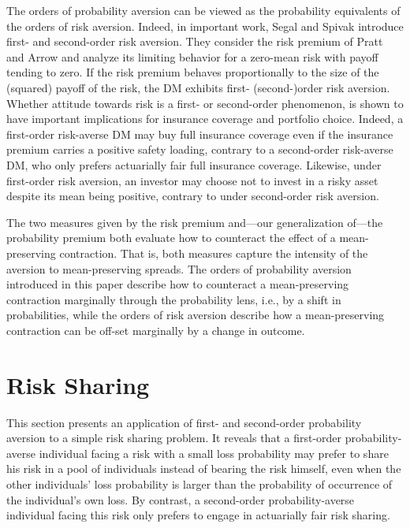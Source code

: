 \documentclass[11pt]{article}
\begin{document}
The orders of probability aversion can be viewed as the probability equivalents of the orders of risk aversion.
Indeed, in important work, Segal and Spivak \cite{SS90}
introduce first- and second-order risk aversion.
They consider the risk premium of Pratt \cite{P64} and Arrow \cite{A65,A71}
and analyze its limiting behavior
for a zero-mean risk with 
payoff 
tending to zero.
If the risk premium behaves proportionally to the size of the (squared) payoff of the risk,
the DM exhibits first- (second-)order risk aversion.
Whether attitude towards risk is a first- or second-order phenomenon,
is shown to have important implications for insurance coverage and portfolio choice.
Indeed, a first-order risk-averse DM
may buy full insurance coverage even if the insurance premium carries a positive safety loading,
contrary to a second-order risk-averse DM, who only prefers actuarially fair full insurance coverage.
Likewise, under first-order risk aversion, an investor may choose not to invest in a risky asset despite its mean being positive,
contrary to under second-order risk aversion.

The two measures given by the risk premium and---our generalization of---the probability premium
both evaluate 
how to counteract the effect of a mean-preserving contraction.
That is, both measures capture the intensity of the aversion to mean-preserving spreads.
The orders of probability aversion introduced in this paper
describe how to counteract a mean-preserving contraction marginally
through the probability lens, i.e., by a shift in probabilities,
while the orders of risk aversion describe how a mean-preserving contraction can be off-set marginally
by a change in outcome.


\setcounter{equation}{0}

\section{Risk Sharing}\label{sec:risksharing}

This section presents an application of first- and second-order probability aversion
to a simple risk sharing problem.
It reveals that a first-order probability-averse individual facing a 
risk with a small loss probability
may prefer to 
share his risk in a pool of individuals instead of bearing the risk himself,
even when the other individuals' loss probability 
is 
larger than the
probability of occurrence of the individual's own loss.
By contrast, a second-order probability-averse individual facing this risk only prefers to engage in actuarially fair 
risk sharing.
\end{document}
